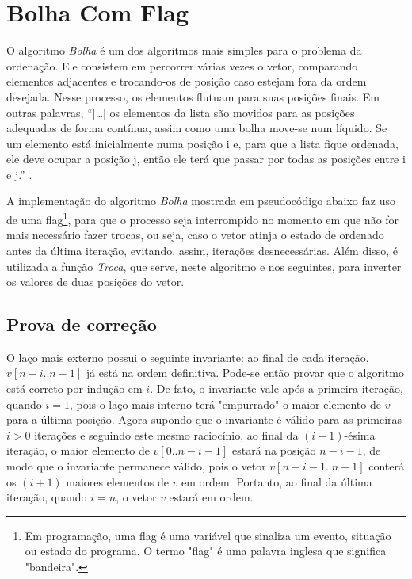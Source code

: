 \section{Bolha Com Flag}
O algoritmo \textit{Bolha} é um dos algoritmos mais simples para o problema da ordenação. Ele consistem em percorrer várias vezes o vetor, comparando elementos adjacentes e trocando-os de posição caso estejam fora da ordem desejada. Nesse processo, os elementos flutuam para suas posições finais. Em outras palavras, ``[…]  os elementos da lista são movidos para as posições adequadas de forma contínua, assim como uma bolha move-se num líquido. Se um elemento está inicialmente numa posição i e, para que a lista fique ordenada, ele deve ocupar a posição j, então ele terá que passar por todas as posições entre i e j.'' \cite[p.8]{viana2011pesquisa}.

A implementação do algoritmo \textit{Bolha} mostrada em pseudocódigo abaixo faz uso de uma flag\footnote{Em programação, uma flag é uma variável que sinaliza um evento, situação ou estado do programa. O termo "flag" é uma palavra inglesa que significa "bandeira".}, para que o processo seja interrompido no momento em que não for mais necessário fazer trocas, ou seja, caso o vetor atinja o estado de ordenado antes da última iteração, evitando, assim, iterações desnecessárias. Além disso, é utilizada a função \textit{Troca}, que serve, neste algoritmo e nos seguintes, para inverter os valores de duas posições do vetor.



\subsection{Prova de correção}
O laço mais externo possui o seguinte invariante: ao final de cada iteração, $v[n-i..n-1]$ já está na ordem definitiva. Pode-se então provar que o algoritmo está correto por indução em $i$. De fato, o invariante vale após a primeira iteração, quando $i = 1$, pois o laço mais interno terá "empurrado" o maior elemento de $v$ para a última posição. Agora supondo que o invariante é válido para as primeiras $i > 0$ iterações e seguindo este mesmo raciocínio, ao final da $(i+1)$-ésima iteração, o maior elemento de $v[0..n-i-1]$ estará na posição $n-i-1$, de modo que o invariante permanece válido, pois o vetor $v[n-i-1..n-1]$ conterá os $(i+1)$ maiores elementos de $v$ em ordem. Portanto, ao final da última iteração, quando $i = n$, o vetor $v$ estará em ordem.

